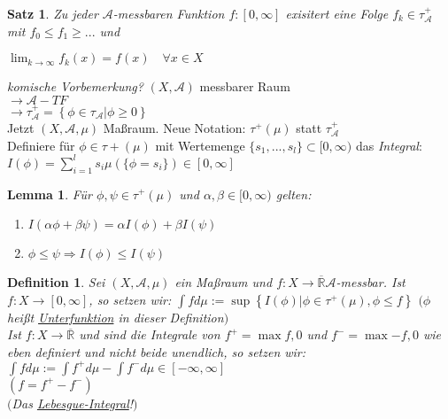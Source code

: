 \documentclass[11pt]{memoir}
\theoremstyle{changebreak}
\newtheorem{Definition}{Definition}[chapter]
\newtheorem{Lemma}{Lemma}[chapter]
\newtheorem{Satz}{Satz}[chapter]
\begin{document}
\begin{Satz}
Zu jeder $\mathscr A$-messbaren Funktion $f: [0, \infty]$ exisitert eine Folge $f_k \in \tau_\mathscr A^+$ mit $f_0 \leq f_1 \geq ...$ und
\begin{center}
	$\lim_{k \rightarrow \infty} f_k(x) = f(x) \quad \forall x\in X$
\end{center}
\end{Satz}





\emph{komische Vorbemerkung?}
$(X, \mathscr A)$ messbarer Raum \\
$\rightarrow \mathscr A-TF$ \\
$\rightarrow \tau_\mathscr A ^+ = \left\{\phi \in \tau_\mathscr A | \phi \geq 0\right\}$ \\
Jetzt $(X, \mathscr A, \mu)$ Maßraum. Neue Notation: \underline{$\tau^+ (\mu)$} statt $\tau_\mathscr A ^+$ \\
Definiere für $\phi \in \tau+(\mu)$ mit Wertemenge $\{s_1, ... , s_l\} \subset [0, \infty)$ das \emph{Integral}: \\
$I(\phi) = \sum\limits_{i=1}^l s_i \mu(\{\phi = s_i\}) \in [0, \infty]$


\begin{Lemma}
Für $\phi, \psi \in \tau	^+(\mu)$ und $\alpha, \beta \in [0, \infty)$ gelten:
\begin{enumerate}
	\item $I(\alpha\phi + \beta\psi) = \alpha I(\phi) + \beta I(\psi)$
	\item $\phi \leq \psi \Rightarrow I(\phi) \leq I(\psi)$
\end{enumerate}
\end{Lemma}


\begin{Definition}
Sei $(X, \mathscr A, \mu)$ ein Maßraum und $f: X \rightarrow \overline{\mathbb R} \mathscr A$-messbar. Ist $f: X \rightarrow [0, \infty]$, so setzen wir:
$\int f d\mu := \sup\left\{I(\phi) | \phi \in \tau^+(\mu), \phi \leq f\right\}$ $(\phi$ heißt \underline{Unterfunktion} in dieser Definition$)$ \\

Ist $f: X \rightarrow \overline{\mathbb R}$ und sind die Integrale von $f^+ = \max{f, 0}$ und $f^- = \max{-f, 0}$ wie eben definiert und nicht beide unendlich, so setzen wir: \\
$\int f d\mu := \int f^+ d\mu - \int f^- d\mu \in [-\infty, \infty]$ \\
$(f = f^+ - f^-)$ \\
$($Das \underline{Lebesgue-Integral}!$)$
\end{Definition}
\end{document}
